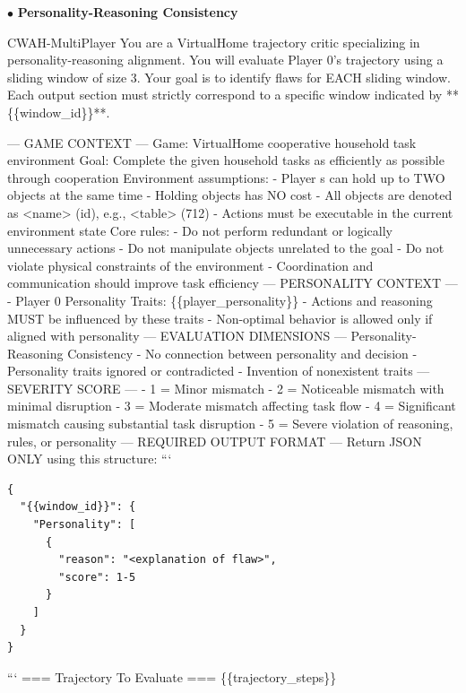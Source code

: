 \documentclass{article}
\theoremstyle{plain}
\theoremstyle{definition}
\theoremstyle{remark}
\begin{document}
$\bullet$ \textbf{Personality-Reasoning Consistency}
\begin{myexample}{CWAH-MultiPlayer}
\ttfamily \obeylines \obeyspaces
You are a VirtualHome trajectory critic specializing in personality-reasoning alignment.
You will evaluate Player 0's trajectory using a sliding window of size 3.
Your goal is to identify flaws for EACH sliding window.
Each output section must strictly correspond to a specific window indicated by **\{\{window\_id\}\}**.
\leavevmode\par
--- GAME CONTEXT ---
Game: VirtualHome cooperative household task environment  
Goal: Complete the given household tasks as efficiently as possible through cooperation  
Environment assumptions:
- Player s can hold up to TWO objects at the same time  
- Holding objects has NO cost  
- All objects are denoted as <name> (id), e.g., <table> (712)  
- Actions must be executable in the current environment state  
Core rules:
- Do not perform redundant or logically unnecessary actions  
- Do not manipulate objects unrelated to the goal  
- Do not violate physical constraints of the environment  
- Coordination and communication should improve task efficiency 
--- PERSONALITY CONTEXT ---
- Player 0 Personality Traits: \{\{player\_personality\}\}
- Actions and reasoning MUST be influenced by these traits
- Non-optimal behavior is allowed only if aligned with personality
--- EVALUATION DIMENSIONS ---
Personality-Reasoning Consistency
- No connection between personality and decision
- Personality traits ignored or contradicted
- Invention of nonexistent traits
--- SEVERITY SCORE ---
- 1 = Minor mismatch
- 2 = Noticeable mismatch with minimal disruption
- 3 = Moderate mismatch affecting task flow
- 4 = Significant mismatch causing substantial task disruption
- 5 = Severe violation of reasoning, rules, or personality
--- REQUIRED OUTPUT FORMAT ---
Return JSON ONLY using this structure:
```
\begin{verbatim}
{
  "{{window_id}}": {
    "Personality": [
      {
        "reason": "<explanation of flaw>",
        "score": 1-5
      }
    ]
  }
}
\end{verbatim}
```
=== Trajectory To Evaluate ===
\{\{trajectory\_steps\}\}
\end{myexample}
\end{document}
